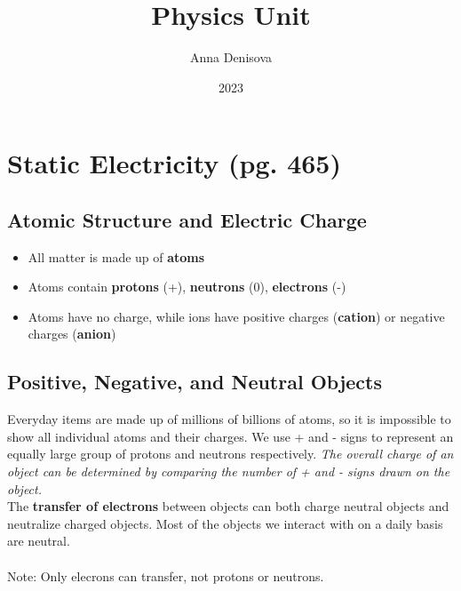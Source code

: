 \documentclass{article}
\title{Physics Unit}
\author{Anna Denisova}
\date{2023}
\begin{document}
\maketitle
\tableofcontents

\newpage


\section{Static Electricity (pg. 465)}

    \subsection*{Atomic Structure and Electric Charge}

    \begin{itemize}
        \item All matter is made up of \textbf{atoms} 
        \item Atoms contain \textbf{protons} (+), \textbf{neutrons} (0), \textbf{electrons} (-)
        \item Atoms have no charge, while ions have positive charges (\textbf{cation}) or negative charges (\textbf{anion})
    \end{itemize}

    \subsection*{Positive, Negative, and Neutral Objects}

    Everyday items are made up of millions of billions of atoms, so it is impossible to show all individual atoms and their charges. We use + and - signs to represent an equally large group of protons and neutrons respectively. \textit{The overall charge of an object can be determined by comparing the number of + and - signs drawn on the object.}\\
    
    The \textbf{transfer of electrons} between objects can both charge neutral objects and neutralize charged objects. Most of the objects we interact with on a daily basis are neutral.\\\\

    Note: Only elecrons can transfer, not protons or neutrons.\\
\end{document}

